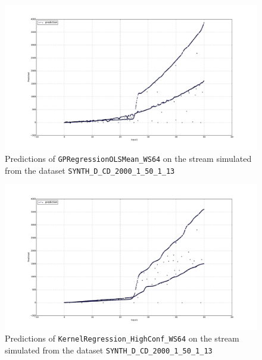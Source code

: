 \begin{figure}[htbp]
  \centering
    \includegraphics[width=\linewidth]{./Figures/gpreg_olsmean_ws64_approximated_func_SYNTH_D_CD_2000_1_50_1_13.pdf}
  \caption{Predictions of \texttt{GPRegressionOLSMean\_WS64} on the stream simulated from the dataset \texttt{SYNTH\_D\_CD\_2000\_1\_50\_1\_13}}
  \label{fig:gpreg_olsmean_ws64_approximated_func_SYNTH_D_CD_2000_1_50_1_13}
\end{figure}

\begin{figure}[htbp]
  \centering
    \includegraphics[width=\linewidth]{./Figures/kreg_ws64_approximated_func_SYNTH_D_CD_2000_1_50_1_13.pdf}
  \caption{Predictions of \texttt{KernelRegression\_HighConf\_WS64} on the stream simulated from the dataset \texttt{SYNTH\_D\_CD\_2000\_1\_50\_1\_13}}
  \label{fig:kreg_ws64_approximated_func_SYNTH_D_CD_2000_1_50_1_13}
\end{figure}

